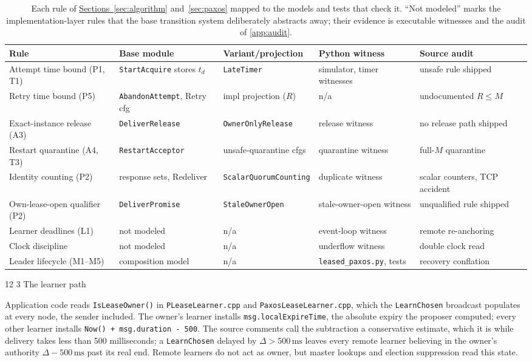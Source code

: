 \documentclass[final,5p,times,twocolumn,number]{elsarticle}
\makeatletter
\newcommand{\code}[1]{\texttt{#1}}
\newcommand{\secsref}[2]{\hyperref[#1]{Sections~\ref*{#1}} and~\hyperref[#2]{\ref*{#2}}}
\renewcommand\subsection{\@startsection{subsection}{2}{\z@}%
           {12\p@ \@plus 6\p@ \@minus 3\p@}%
           {3\p@ \@plus 6\p@ \@minus 3\p@}%
           {\normalfont\normalsize\bfseries}}
\makeatother
\begin{document}
\begin{table}[!t]
\centering
\scriptsize
\setlength{\tabcolsep}{3pt}
\renewcommand{\arraystretch}{1.0}
\begin{tabular}{lllll}
\toprule
\textbf{Rule} & \textbf{Base module} & \textbf{Variant/projection} & \textbf{Python witness} & \textbf{Source audit} \\
\midrule[\heavyrulewidth]
Attempt time bound (P1, T1) & \code{StartAcquire} stores $t_d$ & \code{LateTimer} & simulator, timer witnesses & unsafe rule shipped \\
Retry time bound (P5) & \code{AbandonAttempt}, Retry cfg & impl projection ($R$) & n/a & undocumented $R \leq M$ \\
Exact-instance release (A3) & \code{DeliverRelease} & \code{OwnerOnlyRelease} & release witness & no release path shipped \\
Restart quarantine (A4, T3) & \code{RestartAcceptor} & unsafe-quarantine cfgs & quarantine witness & full-$M$ quarantine \\
Identity counting (P2) & response sets, Redeliver & \code{ScalarQuorumCounting} & duplicate witness & scalar counters, TCP accident \\
Own-lease-open qualifier (P2) & \code{DeliverPromise} & \code{StaleOwnerOpen} & stale-owner-open witness & unqualified rule shipped \\
Learner deadlines (L1) & not modeled & n/a & event-loop witness & remote re-anchoring \\
Clock discipline & not modeled & n/a & underflow witness & double clock read \\
Leader lifecycle (M1--M5) & composition model & n/a & \code{leased\_paxos.py}, tests & recovery conflation \\
\bottomrule
\end{tabular}
\caption{\label{tab:evidence}Each rule of \secsref{sec:algorithm}{sec:paxos} mapped to the models and tests that check it.  ``Not modeled'' marks the implementation-layer rules that the base transition system deliberately abstracts away; their evidence is executable witnesses and the audit of \ref{app:audit}.}
\end{table}

\subsection{The learner path}

Application code reads \code{IsLeaseOwner()} in \code{PLeaseLearner.cpp} and \code{PaxosLeaseLearner.cpp}, which the \code{LearnChosen} broadcast populates at every node, the sender included.  The owner's learner installs \code{msg.localExpireTime}, the absolute expiry the proposer computed; every other learner installs \code{Now() + msg.duration - 500}.  The source comments call the subtraction a conservative estimate, which it is while delivery takes less than 500 milliseconds; a \code{LearnChosen} delayed by $\Delta > 500\,\mathrm{ms}$ leaves every remote learner believing in the owner's authority $\Delta - 500\,\mathrm{ms}$ past its real end.  Remote learners do not act as owner, but master lookups and election suppression read this state.
\end{document}
